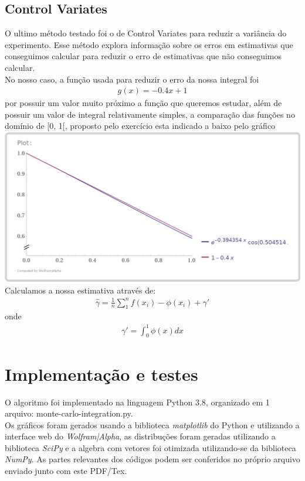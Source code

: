 \documentclass[twocolumn,amsmath,amssymb,floatfix]{revtex4}
\begin{document}
\subsection{Control Variates}
\indent O ultimo método testado foi o de Control Variates para reduzir a variância do experimento. Esse método explora informação sobre os erros em estimativas que conseguimos calcular para reduzir o erro de estimativas que não conseguimos calcular. \\
\indent No nosso caso, a função usada para reduzir o erro da nossa integral foi
\begin{eqnarray}
  g(x) = -0.4x + 1
\end{eqnarray}
por possuir um valor muito próximo a função que queremos estudar, além de possuir um valor de integral relativamente simples, a comparação das funções no domínio de [0, 1[, proposto pelo exercício esta indicado a baixo pelo gráfico
\\\includegraphics[scale=0.23]{control_variate_graph.jpg}
Calculamos a nossa estimativa através de:
\begin{eqnarray}
  \hat\gamma=\frac{1}{n}\sum_1^nf(x_i)-\phi(x_i)+\gamma'
\end{eqnarray}
onde 
\begin{eqnarray}
 \gamma'=\int_0^1\phi(x)dx
\end{eqnarray}
\section{Implementação e testes}

\indent O algoritmo foi implementado na linguagem Python 3.8, organizado em 1 arquivo: monte-carlo-integration.py. \\
\indent Os gráficos foram gerados usando a biblioteca \textit{matplotlib} do Python e utilizando a interface web do \textit{Wolfram|Alpha}, as distribuções foram geradas utilizando a biblioteca \textit{SciPy} e a algebra com vetores foi otimizada utilizando-se da biblioteca \textit{NumPy}. As partes relevantes dos códigos podem ser conferidos no próprio arquivo enviado junto com este PDF/Tex.
\end{document}
